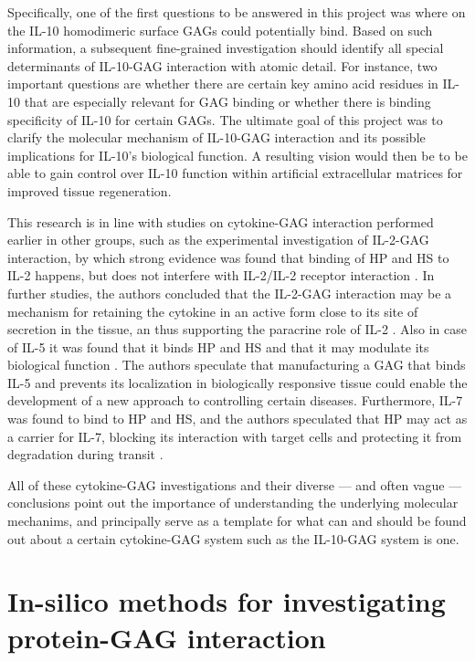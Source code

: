 Specifically, one of the first questions to be answered in this project was
where on the IL-10 homodimeric surface GAGs could potentially bind. Based on
such information, a subsequent fine-grained investigation should identify all
special determinants of IL-10-GAG interaction with atomic detail. For instance,
two important questions are whether there are certain key amino acid residues in
IL-10 that are especially relevant for GAG binding or whether there is binding
specificity of IL-10 for certain GAGs. The ultimate goal of this project was to
clarify the molecular mechanism of IL-10-GAG interaction and its possible
implications for IL-10's biological function. A resulting vision would then be
to be able to gain control over IL-10 function within artificial extracellular
matrices for improved tissue regeneration.

This research is in line with studies on cytokine-GAG interaction performed
earlier in other groups, such as the experimental investigation of IL-2-GAG
interaction, by which strong evidence was found that binding of HP and HS to
IL-2 happens, but does not interfere with IL-2/IL-2 receptor interaction
\cite{il2_gags_rider_1997}. In further studies, the authors concluded that
the IL-2-GAG interaction may be a mechanism for retaining the cytokine in an
active form close to its site of secretion in the tissue, an thus supporting the
paracrine role of IL-2 \cite{il2_gags_1998}. Also in case of IL-5 it was found
that it binds HP and HS and that it may modulate its biological function
\cite{il5_gags_coombe_1998}. The authors speculate that manufacturing a
GAG that binds IL-5 and prevents its localization in biologically responsive
tissue could enable the development of a new approach to controlling certain
diseases. Furthermore, IL-7 was found to bind to HP and HS, and the authors
speculated that HP may act as a carrier for IL-7, blocking its interaction with
target cells and protecting it from degradation during transit
\cite{il7_gags_1995}.

All of these cytokine-GAG investigations and their diverse --- and often vague
--- conclusions point out the importance of understanding the underlying
molecular mechanims, and principally serve as a template for what can and
should be found out about a certain cytokine-GAG system such as the
IL-10-GAG system is one.


\section{In-silico methods for investigating protein-GAG interaction}

